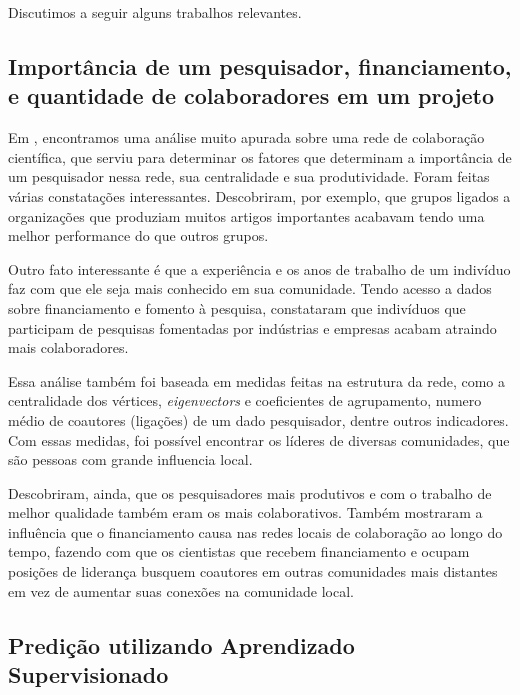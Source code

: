 Discutimos a seguir alguns trabalhos relevantes.

\subsection{Importância de um pesquisador, financiamento, e quantidade de colaboradores em um projeto}
\label{ssec:importance}

Em \citet{Ebadi2015}, encontramos uma análise muito apurada sobre uma rede de colaboração científica, que serviu para determinar os fatores que determinam a importância de um pesquisador nessa rede, sua centralidade e sua produtividade. Foram feitas várias constatações interessantes. Descobriram, por exemplo, que grupos ligados a organizações que produziam muitos artigos importantes acabavam tendo uma melhor performance do que outros grupos.

Outro fato interessante é que a experiência e os anos de trabalho de um indivíduo faz com que ele seja mais conhecido em sua comunidade. Tendo acesso a dados sobre financiamento e fomento à pesquisa, constataram que indivíduos que participam de pesquisas fomentadas por indústrias e empresas acabam atraindo mais colaboradores.

Essa análise também foi baseada em medidas feitas na estrutura da rede, como a centralidade dos vértices, \textit{eigenvectors} e coeficientes de agrupamento, numero médio de coautores (ligações) de um dado pesquisador, dentre outros indicadores. Com essas medidas, foi possível encontrar os líderes de diversas comunidades, que são pessoas com grande influencia local.

Descobriram, ainda, que os pesquisadores mais produtivos e com o trabalho de melhor qualidade também eram os mais colaborativos. Também mostraram a influência que o financiamento causa nas redes locais de colaboração ao longo do tempo, fazendo com que os cientistas que recebem financiamento e ocupam posições de liderança busquem coautores em outras comunidades mais distantes em vez de aumentar suas conexões na comunidade local.



\subsection{Predição utilizando Aprendizado Supervisionado}
\label{ssec:graphs-with-attributes}

